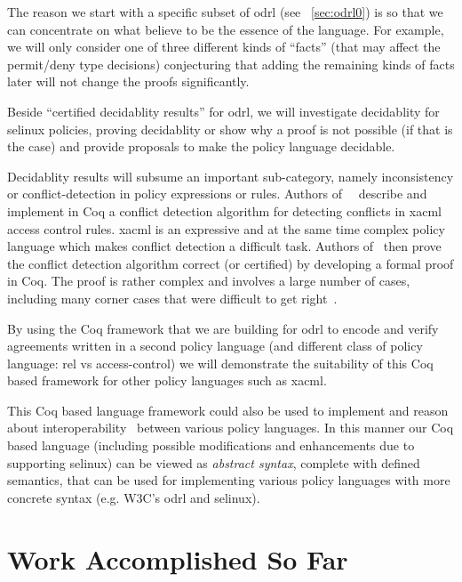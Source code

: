 The reason we start with a specific subset of \ac{odrl} (see ~\ref{sec:odrl0}) is so that we can concentrate on what believe to be the essence of the language. For example, we will only consider one of three different kinds of ``facts'' (that may affect the permit/deny type decisions) conjecturing that adding the remaining kinds of facts later will not change the proofs significantly.

Beside ``certified decidablity results'' for \ac{odrl}, we will investigate decidablity for \ac{selinux} policies, proving decidablity or show why a proof is not possible (if that is the case) and provide proposals to make the policy language decidable.

Decidablity results will subsume an important sub-category, namely inconsistency or conflict-detection in policy expressions or rules. Authors of~\cite{st2012verified}~\cite{felty13} describe and implement in Coq a conflict detection algorithm for detecting conflicts in \ac{xacml} access control rules. \ac{xacml} is an expressive and at the same time complex policy language which makes conflict detection a difficult task. Authors of~\cite{st2012verified} then prove the conflict detection algorithm correct (or certified) by developing a formal proof in Coq. The proof is rather complex and involves a large number of cases, including many
corner cases that were difficult to get right~\cite{st2012verified}. 

By using the Coq framework that we are building for \ac{odrl} to encode and verify agreements written in a second policy language (and different class of policy language: \ac{rel} vs access-control) we will demonstrate the suitability of this Coq based framework for other policy languages such as \ac{xacml}. 

This Coq based language framework could also be used to implement and reason about interoperability~\cite{prados2005interoperability, maronas2009architecture} between various policy languages. In this manner our Coq based language (including possible modifications and enhancements due to supporting \ac{selinux}) can be viewed as \emph{abstract syntax}, complete with defined semantics, that can be used for implementing various policy languages with more concrete syntax (e.g. W3C's \ac{odrl} and \ac{selinux}). 

\section{Work Accomplished So Far}

